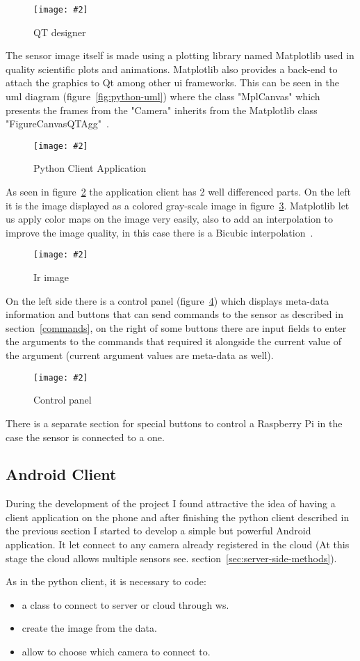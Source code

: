 \documentclass[hidelinks,11pt,a4paper,oneside,article]{memoir}
\newcommand{\putimage}[3][10] %
{
\begin{figure}[h]
	\centering
	\captionsetup{justification=centering}
	\texttt{[image: \#2]}
	\caption{#3}
	\label{fig:#2}
\end{figure}
}
\begin{document}
    \putimage{qt-designer}{QT designer}

The sensor image itself is made using a plotting library named Matplotlib used in quality scientific plots and animations. Matplotlib  also provides a back-end to attach the graphics to Qt among other \gls{ui} frameworks. This can be seen in the \gls{uml} diagram (figure~\ref{fig:python-uml}) where the class "MplCanvas" which presents the frames from the "Camera" inherits from the Matplotlib class "FigureCanvasQTAgg"~\cite{matplotlibqt4agg}.

    \putimage{python-client}{Python Client Application}
    
As seen in figure~\ref{fig:python-client} the application client has 2 well differenced parts. On the left it is the image displayed as a colored gray-scale image in figure~\ref{fig:ir-image}. Matplotlib let us apply color maps on the image very easily, also to add an interpolation to improve the image quality, in this case there is a Bicubic interpolation~\cite{matplotlibinter}.

    \putimage[5]{ir-image}{Ir image}

On the left side there is a control panel (figure~\ref{fig:control-panel}) which displays meta-data information and buttons that can send commands to the sensor as described in section~\ref{commands}, on the right of some buttons there are input fields to enter the arguments to the commands that required it alongside the current value of the argument (current argument values are meta-data as well).

    \putimage{control-panel}{Control panel}
    
There is a separate section for special buttons to control a Raspberry Pi in the case the sensor is connected to a one.


\subsection{Android Client}
During the development of the project I found attractive the idea of having a client application on the phone and after finishing the python client described in the previous section I started to develop a simple but powerful Android application. It let connect to any camera already registered in the cloud (At this stage the cloud allows multiple sensors see. section~\ref{sec:server-side-methods}).

As in the python client, it is necessary to code:
\begin{itemize}
    \item a class to connect to server or cloud through \gls{ws}.
    \item create the image from the data.
    \item allow to choose which camera to connect to.
\end{itemize}
\end{document}
